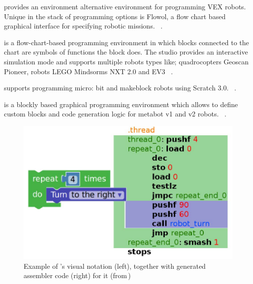 \parhead{\robotmesh} provides an environment alternative environment for programming VEX robots. Unique in the stack of programming options is Flowol, a flow chart based graphical interface for specifying robotic missions. %
~\cite{RobotMeshStudio}.

\parhead{\trik} is a flow-chart-based programming environment in which blocks connected to the chart are symbols of functions the block does. The studio provides an interactive simulation mode and supports multiple robots types like; quadrocopters Geoscan Pioneer, robots LEGO Mindsorms NXT 2.0 and EV3 ~\cite{STRIKStudio, Mordvinov2017}. 

\parhead{\makeblock} supports programming micro: bit and makeblock robots using Scratch 3.0. %
~\cite{Makeblock}.

\parhead{\metabot} is a blockly based graphical programming environment which allows to define custom blocks and code generation logic for metabot v1 and v2 robots. %
~\cite{Passault2016,Metabot}.

\begin{figure}[t]
     \centering
    \includegraphics[width=.9\columnwidth]{metabotsample.jpg}
      \caption{Example of \metabot's visual notation (left), together with generated assembler code (right) for it (from\,\cite{Passault2016})}
      \label{metabot}
   \end{figure}

